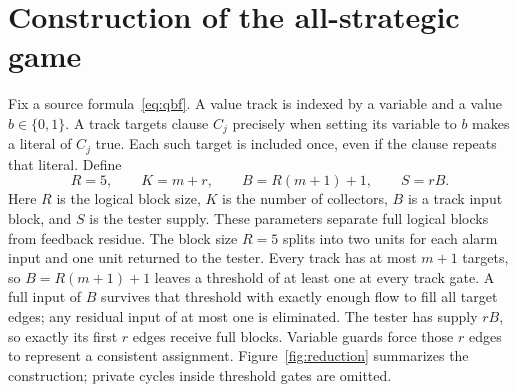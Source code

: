 \documentclass[11pt]{article}
\begin{document}
\section{Construction of the all-strategic game}
Fix a source formula~\eqref{eq:qbf}. A value track is indexed by a variable and a value $b\in\{0,1\}$. A track targets clause $C_j$ precisely when setting its variable to $b$ makes a literal of $C_j$ true. Each such target is included once, even if the clause repeats that literal. Define
\[
 R=5,\qquad K=m+r,\qquad B=R(m+1)+1,\qquad S=rB.
\]
Here $R$ is the logical block size, $K$ is the number of collectors, $B$ is a track input block, and $S$ is the tester supply. These parameters separate full logical blocks from feedback residue. The block size $R=5$ splits into two units for each alarm input and one unit returned to the tester. Every track has at most $m+1$ targets, so $B=R(m+1)+1$ leaves a threshold of at least one at every track gate. A full input of $B$ survives that threshold with exactly enough flow to fill all target edges; any residual input of at most one is eliminated. The tester has supply $rB$, so exactly its first $r$ edges receive full blocks. Variable guards force those $r$ edges to represent a consistent assignment. Figure~\ref{fig:reduction} summarizes the construction; private cycles inside threshold gates are omitted.
\end{document}
